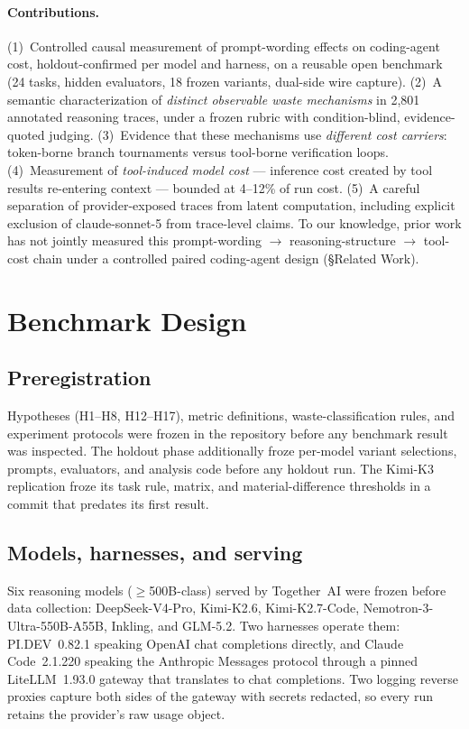 \documentclass[11pt]{article}
\newcommand{\pidev}{PI.DEV}
\newcommand{\cc}{Claude Code}
\begin{document}
\paragraph{Contributions.}
(1)~Controlled causal measurement of prompt-wording effects on
coding-agent cost, holdout-confirmed per model and harness, on a reusable
open benchmark (24 tasks, hidden evaluators, 18 frozen variants, dual-side
wire capture). (2)~A semantic characterization of \emph{distinct
observable waste mechanisms} in 2{,}801 annotated reasoning traces, under
a frozen rubric with condition-blind, evidence-quoted judging.
(3)~Evidence that these mechanisms use \emph{different cost carriers}:
token-borne branch tournaments versus tool-borne verification loops.
(4)~Measurement of \emph{tool-induced model cost} --- inference cost
created by tool results re-entering context --- bounded at 4--12\% of run
cost. (5)~A careful separation of provider-exposed traces from latent
computation, including explicit exclusion of claude-sonnet-5 from
trace-level claims. To our knowledge, prior work has not jointly measured
this prompt-wording $\to$ reasoning-structure $\to$ tool-cost chain under
a controlled paired coding-agent design (\S Related Work).

\section{Benchmark Design}

\subsection{Preregistration}
Hypotheses (H1--H8, H12--H17), metric definitions, waste-classification
rules, and experiment protocols were frozen in the repository before any
benchmark result was inspected. The holdout phase additionally froze
per-model variant selections, prompts, evaluators, and analysis code
before any holdout run. The Kimi-K3 replication froze its task rule,
matrix, and material-difference thresholds in a commit that predates its
first result.

\subsection{Models, harnesses, and serving}
Six reasoning models ($\geq$500B-class) served by Together~AI were frozen
before data collection: DeepSeek-V4-Pro, Kimi-K2.6, Kimi-K2.7-Code,
Nemotron-3-Ultra-550B-A55B, Inkling, and GLM-5.2. Two harnesses operate
them: \pidev{}~0.82.1 speaking OpenAI chat completions directly, and
\cc{}~2.1.220 speaking the Anthropic Messages protocol through a pinned
LiteLLM~1.93.0 gateway that translates to chat completions. Two logging
reverse proxies capture both sides of the gateway with secrets redacted,
so every run retains the provider's raw usage object.
\end{document}
